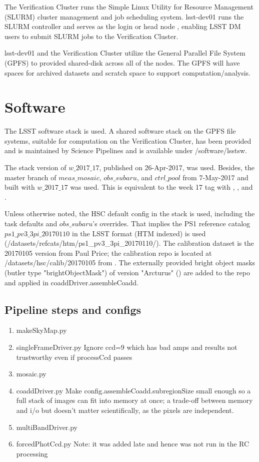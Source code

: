\documentclass[DM,authoryear,toc]{lsstdoc}
\begin{document}
The Verification Cluster runs the Simple Linux Utility for Resource Management (SLURM) cluster management and job scheduling system. lsst-dev01 runs the SLURM controller and serves as the login or head node , enabling LSST DM users to submit SLURM jobs to the Verification Cluster.

lsst-dev01 and the Verification Cluster utilize the General Parallel File System (GPFS) to provided shared-disk across all of the nodes. The GPFS will have spaces for archived datasets and scratch space to support computation/analysis.



\section{Software}

The LSST software stack is used. A shared software stack on the GPFS file systems, suitable for computation on the Verification Cluster, has been provided and is maintained by Science Pipelines and is available under /software/lsstsw.

The stack version of $w{\_}2017{\_}17$, published on 26-Apr-2017, was used.
Besides, the master branch of $meas{\_}mosaic$, $obs{\_}subaru$, and $ctrl{\_}pool$ from 7-May-2017 and built with $w{\_}2017{\_}17$ was used.
This is equivalent to the week 17 tag with , , and .

Unless otherwise noted, the HSC default config in the stack is used, including the task defaults and $obs{\_}subaru$'s overrides.
That implies the PS1 reference catalog $ps1{\_}pv3{\_}3pi{\_}20170110$ in the LSST format (HTM indexed) is used (/datasets/refcats/htm/ps1{\_}pv3{\_}3pi{\_}20170110/).
The calibration dataset is the 20170105 version from Paul Price; the calibration repo is located at /datasets/hsc/calib/20170105 from .
The externally provided bright object masks (butler type "brightObjectMask") of version "Arcturus" () are added to the repo and applied in coaddDriver.assembleCoadd.

\subsection{Pipeline steps and configs}
\begin{enumerate}
\item
makeSkyMap.py
\item
singleFrameDriver.py     Ignore ccd=9 which has bad amps and results not trustworthy even if processCcd passes
\item
mosaic.py
\item
coaddDriver.py   Make config.assembleCoadd.subregionSize small enough so a full stack of images can fit into memory at once; a trade-off between memory and i/o but doesn't matter scientifically, as the pixels are independent.
\item
multiBandDriver.py
\item
forcedPhotCcd.py   Note: it was added late and hence was not run in the RC processing
\end{enumerate}
\end{document}
